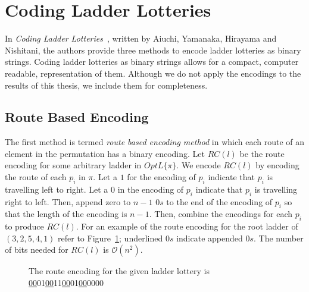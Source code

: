 \section{Coding Ladder Lotteries}
In \emph{Coding Ladder Lotteries}~\cite{A5}, written by Aiuchi, Yamanaka, Hirayama and Nishitani, the authors provide three methods to encode ladder lotteries as 
binary strings. Coding ladder lotteries as binary strings allows for a compact, computer readable, representation of them. Although we do not 
apply the encodings to the results of this thesis, we include them for completeness.
\subsection{Route Based Encoding}
The first method is termed \emph{route based encoding method} in 
which each route of an element in the permutation has a binary encoding. Let $RC(l)$ be the route encoding for 
some arbitrary ladder in $OptL\{\pi\}$. We encode $RC(l)$ by encoding the route of each $p_{i}$ in $\pi$. Let a $1$ 
for the encoding of $p_{i}$ indicate that $p_{i}$ is travelling left to right. Let a $0$ in the encoding of $p_{i}$ indicate 
that $p_{i}$ is travelling right to left. Then, append zero to $n-1$ $0s$ to the end of the encoding of $p_{i}$ so that the length 
of the encoding is $n-1$. Then, combine the encodings for each $p_{i}$ to produce $RC(l)$.   
For an example of the route encoding for the root ladder of $(3,2,5,4,1)$ refer to 
Figure~\ref{fig:route-encoding}; underlined $0s$ indicate appended $0s$. The number of bits needed for $RC(l)$ is $\mathcal{O}(n^{2})$.\par 
\begin{figure}[!htp]
    \begin{center}
    \end{center}
   
 \caption{The route encoding for the given ladder lottery is \underline{00}01\underline{00}11\underline{00}01\underline{00}0000}
 \label{fig:route-encoding}

\end{figure}

